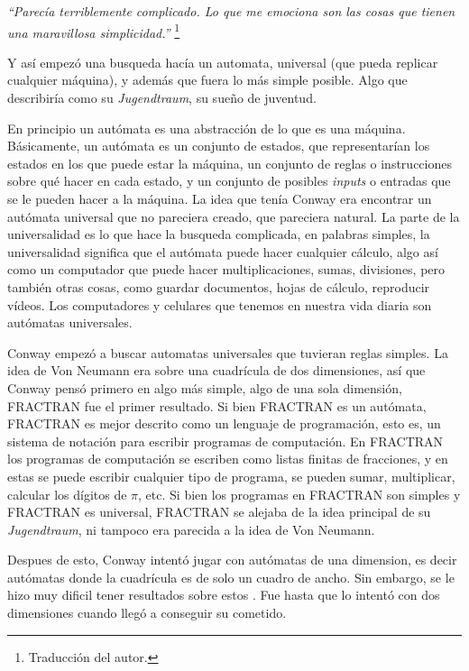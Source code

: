 \textit{``Parec\'ia terriblemente complicado. Lo que me emociona son las cosas que tienen una maravillosa simplicidad.''} \footnote{Traducci\'on del autor.}

Y as\'i empez\'o una busqueda hac\'ia un automata, universal (que pueda replicar cualquier m\'aquina), y adem\'as que fuera lo m\'as simple posible. Algo que describir\'ia como su \textit{Jugendtraum}, su sueño de juventud.

En principio un aut\'omata es una abstracci\'on de lo que es una m\'aquina. B\'asicamente, un aut\'omata es un conjunto de estados, que representar\'ian los estados en los que puede estar la m\'aquina, un conjunto de reglas o instrucciones sobre qu\'e hacer en cada estado, y un conjunto de posibles \textit{inputs} o entradas que se le pueden hacer a la m\'aquina. La idea que ten\'ia Conway era encontrar un aut\'omata universal que no pareciera creado, que pareciera natural. La parte de la universalidad es lo que hace la busqueda complicada, en palabras simples, la universalidad significa que el aut\'omata puede hacer cualquier c\'alculo, algo as\'i como un computador que puede hacer multiplicaciones, sumas, divisiones, pero tambi\'en otras cosas, como guardar documentos, hojas de c\'alculo, reproducir v\'ideos. Los computadores y celulares que tenemos en nuestra vida diaria son aut\'omatas universales.

Conway empez\'o a buscar automatas universales que tuvieran reglas simples. La idea de Von Neumann era sobre una cuadr\'icula de dos dimensiones, as\'i que Conway pens\'o primero en algo m\'as simple, algo de una sola dimensi\'on, FRACTRAN fue el primer resultado. Si bien FRACTRAN es un aut\'omata, FRACTRAN es mejor descrito como un lenguaje de programaci\'on, esto es, un sistema de notaci\'on para escribir programas de computaci\'on. En FRACTRAN los programas de computaci\'on se escriben como listas finitas de fracciones, y en estas se puede escribir cualquier tipo de programa, se pueden sumar, multiplicar, calcular los d\'igitos de $\pi$, etc. Si bien los programas en FRACTRAN son simples y FRACTRAN es universal, FRACTRAN se alejaba de la idea principal de su \textit{Jugendtraum}, ni tampoco era parecida a la idea de Von Neumann.

Despues de esto, Conway intent\'o jugar con aut\'omatas de una dimension, es decir aut\'omatas donde la cuadr\'icula es de solo un cuadro de ancho. Sin embargo, se le hizo muy dificil tener resultados sobre estos \cite{Roberts2015-ur}. Fue hasta que lo intent\'o con dos dimensiones cuando lleg\'o a conseguir su cometido.

